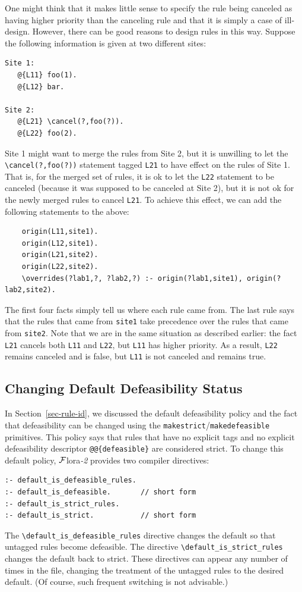 \documentclass[11pt]{article}
\newcommand{\FLORA}{{\mbox{\sc ${\cal F}${lora}\rm\emph{-2}}}\xspace}
\newcommand{\FLSYSTEM}{\FLORA}
\newcommand{\bs}{\textbackslash}
\begin{document}
One might think that it makes little sense to specify the rule being
canceled as having higher priority than the canceling rule and that it is
simply a case of ill-design. However, there can be good reasons to design
rules in this way. Suppose the following information is given at two different sites:
\begin{verbatim}
Site 1:
   @{L11} foo(1).
   @{L12} bar.

Site 2:
   @{L21} \cancel(?,foo(?)).  
   @{L22} foo(2).
\end{verbatim}
Site 1 might want to merge the rules from Site 2, but it is unwilling to
let the {\tt \bs{}cancel(?,foo(?))} statement tagged {\tt L21} to have effect
on the rules of Site 1. That is, for the merged set of rules, it is ok to
let the {\tt L22} statement to be canceled (because it was supposed to be
canceled at Site 2), but it is not ok for the newly merged rules to cancel
{\tt L21}. To achieve this effect, we can add the following statements to
the above:
\begin{verbatim}
    origin(L11,site1).
    origin(L12,site1).
    origin(L21,site2).
    origin(L22,site2).
    \overrides(?lab1,?, ?lab2,?) :- origin(?lab1,site1), origin(?lab2,site2).
\end{verbatim}
The first four facts simply tell us where each rule came from.  The
last rule says that the rules that came from {\tt site1} take precedence
over the rules that came from {\tt site2}.  Note that we are in the same
situation as described earlier: the fact {\tt L21} cancels both {\tt L11}
and {\tt L22}, but {\tt L11} has higher priority. As a result, {\tt L22}
remains canceled and is false, but {\tt L11} is not canceled and remains
true.

\subsection{Changing  Default Defeasibility Status}

In Section~\ref{sec-rule-id}, we discussed the default
defeasibility policy and the fact that defeasibility can be changed using
the \texttt{makestrict}/\texttt{makedefeasible} primitives.  
This policy says that rules that have no explicit tags and no explicit
defeasibility descriptor \texttt{@@\{defeasible\}}  are considered strict. To change this default
policy, \FLSYSTEM provides two compiler directives:
\begin{verbatim}
:- default_is_defeasible_rules.
:- default_is_defeasible.       // short form
:- default_is_strict_rules.
:- default_is_strict.           // short form
\end{verbatim}
The \verb|\default_is_defeasible_rules| directive changes the default so
that untagged rules become defeasible. The directive
\verb|\default_is_strict_rules| changes the default back to strict.
These directives can appear any number of times in the file,
changing the treatment of the untagged rules to the desired default.
(Of course, such frequent switching is not advisable.)
\end{document}
